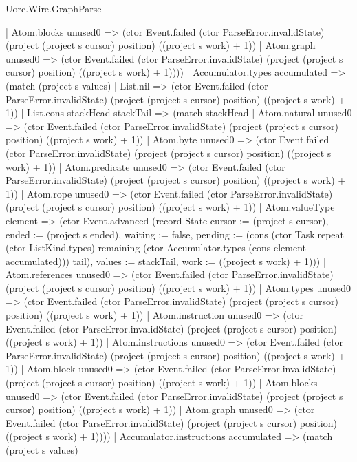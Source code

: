 \begin{lexlean}{Uorc.Wire.GraphParse}
\begin{semanticmodule}
{            | Atom.blocks unused0 => (ctor Event.failed (ctor ParseError.invalidState) (project (project s cursor) position) ((project s work) + 1))
            | Atom.graph unused0 => (ctor Event.failed (ctor ParseError.invalidState) (project (project s cursor) position) ((project s work) + 1))))
        | Accumulator.types accumulated => (match (project s values)
          | List.nil => (ctor Event.failed (ctor ParseError.invalidState) (project (project s cursor) position) ((project s work) + 1))
          | List.cons stackHead stackTail => (match stackHead
            | Atom.natural unused0 => (ctor Event.failed (ctor ParseError.invalidState) (project (project s cursor) position) ((project s work) + 1))
            | Atom.byte unused0 => (ctor Event.failed (ctor ParseError.invalidState) (project (project s cursor) position) ((project s work) + 1))
            | Atom.predicate unused0 => (ctor Event.failed (ctor ParseError.invalidState) (project (project s cursor) position) ((project s work) + 1))
            | Atom.rope unused0 => (ctor Event.failed (ctor ParseError.invalidState) (project (project s cursor) position) ((project s work) + 1))
            | Atom.valueType element => (ctor Event.advanced (record State {cursor := (project s cursor), ended := (project s ended), waiting := false, pending := (cons (ctor Task.repeat (ctor ListKind.types) remaining (ctor Accumulator.types (cons element accumulated))) tail), values := stackTail, work := ((project s work) + 1)}))
            | Atom.references unused0 => (ctor Event.failed (ctor ParseError.invalidState) (project (project s cursor) position) ((project s work) + 1))
            | Atom.types unused0 => (ctor Event.failed (ctor ParseError.invalidState) (project (project s cursor) position) ((project s work) + 1))
            | Atom.instruction unused0 => (ctor Event.failed (ctor ParseError.invalidState) (project (project s cursor) position) ((project s work) + 1))
            | Atom.instructions unused0 => (ctor Event.failed (ctor ParseError.invalidState) (project (project s cursor) position) ((project s work) + 1))
            | Atom.block unused0 => (ctor Event.failed (ctor ParseError.invalidState) (project (project s cursor) position) ((project s work) + 1))
            | Atom.blocks unused0 => (ctor Event.failed (ctor ParseError.invalidState) (project (project s cursor) position) ((project s work) + 1))
            | Atom.graph unused0 => (ctor Event.failed (ctor ParseError.invalidState) (project (project s cursor) position) ((project s work) + 1))))
        | Accumulator.instructions accumulated => (match (project s values)
}
\end{semanticmodule}
\end{lexlean}
